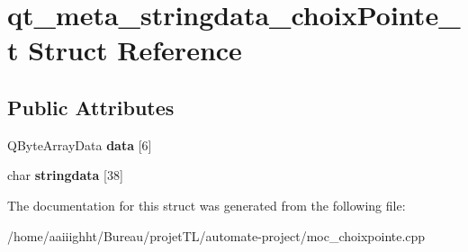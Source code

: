 \hypertarget{structqt__meta__stringdata__choix_pointe__t}{\section{qt\-\_\-meta\-\_\-stringdata\-\_\-choix\-Pointe\-\_\-t Struct Reference}
\label{structqt__meta__stringdata__choix_pointe__t}
}
\subsection*{Public Attributes}
\begin{DoxyCompactItemize}
\item 
\hypertarget{structqt__meta__stringdata__choix_pointe__t_ad3b353765e9d7e892b76492d283369d8}{Q\-Byte\-Array\-Data {\bfseries data} \mbox{[}6\mbox{]}}\label{structqt__meta__stringdata__choix_pointe__t_ad3b353765e9d7e892b76492d283369d8}

\item 
\hypertarget{structqt__meta__stringdata__choix_pointe__t_afc6132c465afb6133de2cea8933ef830}{char {\bfseries stringdata} \mbox{[}38\mbox{]}}\label{structqt__meta__stringdata__choix_pointe__t_afc6132c465afb6133de2cea8933ef830}

\end{DoxyCompactItemize}


The documentation for this struct was generated from the following file\-:\begin{DoxyCompactItemize}
\item 
/home/aaiiighht/\-Bureau/projet\-T\-L/automate-\/project/moc\-\_\-choixpointe.\-cpp\end{DoxyCompactItemize}
